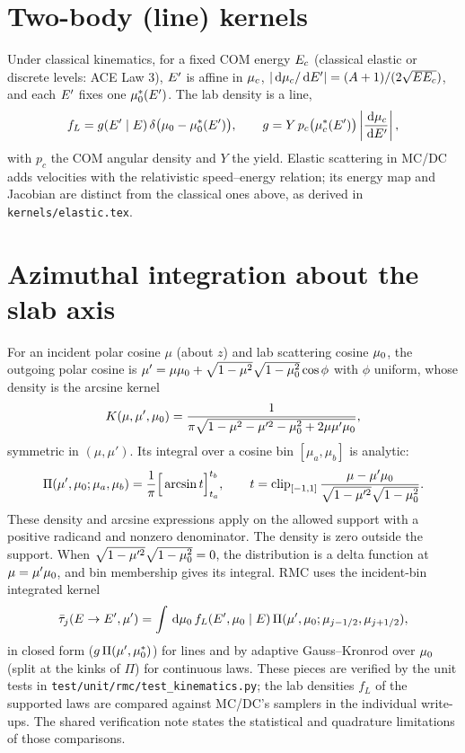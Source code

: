 \documentclass[11pt]{article}
\begin{document}
\section{Two-body (line) kernels}

Under classical kinematics, for a fixed COM energy $E_{c}$
(classical elastic or discrete levels: ACE Law 3),
$E'$ is affine in $\mu_{c}$,
$\left|\,\mathrm{d}\mu_{c}/\,\mathrm{d}E'\right| = (A+1)/(2\sqrt{EE_{c}})$, and each $E'$ fixes one
$\mu_0^*(E')$. The lab density is a line,
\begin{equation}
  f_L = g(E' \mid E)\,\delta\big(\mu_0 - \mu_0^*(E')\big),\qquad
  g = Y\,p_c\big(\mu_{c}^*(E')\big)\left|\frac{\,\mathrm{d}\mu_{c}}{\,\mathrm{d}E'}\right| ,
\end{equation}
with $p_c$ the COM angular density and $Y$ the yield. Elastic scattering in MC/DC adds
velocities with the relativistic speed--energy relation; its energy map and Jacobian
are distinct from the classical ones above, as derived in \texttt{kernels/elastic.tex}.

\section{Azimuthal integration about the slab axis}

For an incident polar cosine $\mu$ (about $z$) and lab scattering cosine $\mu_0$, the
outgoing polar cosine is $\mu' = \mu\mu_0 + \sqrt{1-\mu^2}\sqrt{1-\mu_0^2}\cos\phi$
with $\phi$ uniform, whose density is the arcsine kernel
\begin{equation}
  K(\mu, \mu', \mu_0) = \frac{1}{\pi\sqrt{1 - \mu^2 - \mu'^2 - \mu_0^2 + 2\mu\mu'\mu_0}},
\end{equation}
symmetric in $(\mu, \mu')$. Its integral over a cosine bin $[\mu_a, \mu_b]$ is analytic:
\begin{equation}
  \Pi(\mu', \mu_0; \mu_a, \mu_b) = \frac{1}{\pi}\Big[\arcsin t\Big]_{t_a}^{t_b},\qquad
  t = \operatorname{clip}_{[-1,1]}\frac{\mu - \mu'\mu_0}{\sqrt{1-\mu'^2}\sqrt{1-\mu_0^2}}.
\end{equation}
These density and arcsine expressions apply on the allowed support with a positive
radicand and nonzero denominator. The density is zero outside the support.
When $\sqrt{1-\mu'^2}\sqrt{1-\mu_0^2}=0$, the distribution is a delta function
at $\mu=\mu'\mu_0$, and bin membership gives its integral.
RMC uses the incident-bin integrated kernel
\begin{equation}
  \bar\tau_j(E \to E', \mu') = \int\,\mathrm{d}\mu_0\, f_L(E', \mu_0 \mid E)\,
  \Pi(\mu', \mu_0; \mu_{j-1/2}, \mu_{j+1/2}),
\end{equation}
in closed form ($g\,\Pi(\mu', \mu_0^*)$) for lines and by adaptive Gauss--Kronrod over
$\mu_0$ (split at the kinks of $\Pi$) for continuous laws. These pieces are verified
by the unit tests in \texttt{test/unit/rmc/test\_kinematics.py}; the lab densities
$f_L$ of the supported laws are compared against MC/DC's samplers in the individual
write-ups. The shared verification note states the statistical and quadrature
limitations of those comparisons.
\end{document}
